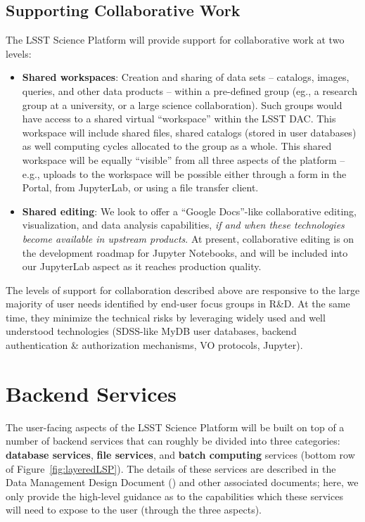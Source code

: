 \documentclass[DM,lsstdraft,toc]{lsstdoc}
\begin{document}
\subsection{Supporting Collaborative Work\label{sec:collab}}

The LSST Science Platform will provide support for collaborative work at two levels:
\begin{itemize}
	\item \textbf{Shared workspaces}: Creation and sharing of data sets -- catalogs, images, queries, and other data products -- within a pre-defined group (eg., a research group at a university, or a large science collaboration). Such groups would have access to a shared virtual ``workspace'' within the LSST DAC. This workspace will include shared files, shared catalogs (stored in user databases) as well computing cycles allocated to the group as a whole. This shared workspace will be equally ``visible'' from all three aspects of the platform -- e.g., uploads to the workspace will be possible either through a form in the Portal, from JupyterLab, or using a file transfer client.

	\item \textbf{Shared editing}: We look to offer a ``Google Docs''-like collaborative editing, visualization, and data analysis capabilities, \emph{if and when these technologies become available in upstream products}. At present, collaborative editing is on the development roadmap for Jupyter  Notebooks, and will be included into our JupyterLab aspect as it reaches production quality.
\end{itemize}

The levels of support for collaboration described above are responsive to the large majority of user needs identified by end-user focus groups in R\&D. At the same time, they minimize the technical risks by leveraging widely used and well understood technologies (SDSS-like MyDB user databases, backend authentication \& authorization mechanisms, VO protocols, Jupyter).

\section{Backend Services\label{sec:backend}}

The user-facing aspects of the LSST Science Platform will be built on top of a number of backend services that can roughly be divided into three categories: \textbf{database services}, \textbf{file services}, and \textbf{batch computing} services (bottom row of Figure~\ref{fig:layeredLSP}). The details of these services are described in the Data Management Design Document () and other associated documents; here, we only provide the high-level guidance as to the capabilities which these services will need to expose to the user (through the three aspects).
\end{document}
